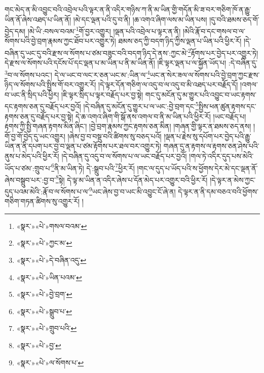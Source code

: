 གང་མེད་ན་མི་འབྱུང་བའི་འབྲེལ་པའི་ལྟར་ན་ནི་འདིར་གཉིས་ཀ་ནི་མ་ཡིན་གྱི་གདོན་མི་ཟ་བར་གཅིག་ཁོ་ན་རྒྱུ་ཡིན་ནོ་ཞེས་འཐད་པ་ཡིན་ནོ། །མེ་དང་ལྡན་པའི་དུ་བ་ནི། །ཆ་འགའ་ཞིག་ལས་མ་ཡིན་པས། །དུ་བའི་ཐམས་ཅད་གོ་བྱེད་དམ། །མེ་ཡི་:བསལ་བའམ་\footnote{«སྣར་»«པེ་»གསལ་བའམ་}གོ་བྱར་འགྱུར། །ལྡན་པའི་འབྲེལ་པ་ལྟར་ན་ནི། །མེའི་རྣོ་བ་དང་གསལ་བ་ལ་སོགས་པའི་བྱེ་བྲག་རྣམས་ཀྱང་ཐོབ་པར་འགྱུར་ཏེ། ཐམས་ཅད་ཀྱི་བདག་ཉིད་ཀྱིས་ལྡན་པ་ཡིན་པའི་ཕྱིར་རོ། །དེ་བཞིན་དུ་ཡང་དུ་བའི་རྫས་ལ་སོགས་པ་ཙམ་བཟུང་བའི་བདག་ཉིད་དེ་ནས་:ཀྱང་མེ་\footnote{«སྣར་»«པེ་»ཀྱང་མ་}རྟོགས་པར་བྱེད་པར་འགྱུར་ཏེ། དེ་རྫས་ལ་སོགས་པའི་དངོས་པོ་དང་ལྡན་པ་མ་ཡིན་པ་ནི་མ་ཡིན་ནོ། །ཇི་ལྟར་ལྡན་པ་ལ་སྐྱོན་ཡོད་པ། :དེ་བཞིན་དུ་\footnote{«སྣར་»«པེ་»དེ་བཞིན་འདུ་}བ་ལ་སོགས་པའང་། དེ་ལ་ཡང་བ་ལང་ར་ཅན་ཡང་མ་:ཡིན་ལ་\footnote{«སྣར་»«པེ་»ཡིན་པའམ་}ཡང་ན་སེར་ཟལ་ལ་སོགས་པའི་བྱེ་བྲག་ཀྱང་རྫས་ཉིད་ལ་སོགས་པའི་སྤྱིས་གོ་བར་འགྱུར་རོ། །དེ་ལྟར་དོན་གཅིག་ལ་འདུ་བ་ལ་འདུ་བ་མི་འཐད་པར་བརྗོད་དོ། །འགལ་བ་ཡང་ནི་སྲིད་པའི་ཕྱིར། །ཇི་ལྟར་སྲིད་པ་ལྟར་བརྗོད་པར་བྱ་སྟེ། གང་དུ་མངོན་དུ་མ་གྱུར་པའི་འབྱུང་བ་ཡང་རྟགས་དང་རྟགས་ཅན་དུ་བརྗོད་པར་བྱའོ། །དེ་བཞིན་དུ་མངོན་དུ་གྱུར་པ་ལ་ཡང་:བྱེ་བྲག་དང་\footnote{«སྣར་»«པེ་»བྱེ་བྲག་}སྤྱིས་ཕན་ཚུན་རྟགས་དང་རྟགས་ཅན་དུ་བརྗོད་པར་བྱ་སྟེ། དེ་ཆ་འགའ་ཞིག་གི་སྒོ་ནས་འགལ་བ་ནི་མ་ཡིན་པའི་ཕྱིར་རོ། །ཡང་བརྗོད་པ། རྟགས་ཀྱི་སྤྱི་གཞན་རྟགས་མིན་ཞིང་། །བྱེ་བྲག་རྣམས་ཀྱང་རྟགས་ཅན་མིན། །གཞན་གྱི་ལྟར་ན་ཐམས་ཅད་ནས། །གོ་བྱ་གོ་བྱེད་དུ་ཡང་འགྱུར། །ཞེས་བྱ་བ་བསྡུ་བའི་ཚིགས་སུ་བཅད་པའོ། །ལྡན་པ་རྗེས་སུ་དཔོག་པར་བྱེད་པའི་རྒྱུ་ཡིན་ན་ནི་དཔག་པར་བྱ་བ་ལྡན་པ་ཙམ་རྟོགས་པར་ཐལ་བར་འགྱུར་ཏེ། གཞན་དུ་ན་རྟགས་ལ་རྟགས་ཅན་ཤེས་པའི་ནུས་པ་མེད་པའི་ཕྱིར་རོ། །དེ་བཞིན་དུ་འདུ་བ་ལ་སོགས་པ་ལ་ཡང་བརྗོད་པར་བྱའོ། །གལ་ཏེ་འདིར་དུད་པས་མེའི་ཡོད་པ་ཙམ་:གྲུབ་པ་\footnote{«སྣར་»«པེ་»སྒྲུབ་པ་}ནི་མ་ཡིན་ཏེ། དེ་:སྒྲུབ་པའི་\footnote{«སྣར་»«པེ་»གྲུབ་པའི་}ཕྱིར་རོ། །གང་ལ་དུད་པ་ཡོད་པའི་ས་ཕྱོགས་དེར་མེ་དང་ལྡན་ནོ་ཞེས་བསྒྲུབ་པར་:བྱ་བ་\footnote{«སྣར་»«པེ་»བྱ་}སྟེ། དེ་ལྟ་མ་ཡིན་ན་འདིར་ཞེས་པ་དོན་མེད་པར་འགྱུར་བའི་ཕྱིར་རོ། །དེ་ལྟར་ན་མེས་ཀྱང་དུད་པའམ་མེའི་:རྣོ་བ་ལ་སོགས་པ་ལ་\footnote{«སྣར་»«པེ་»ལ་སོགས་པ་}ཡང་ཞེས་བྱ་བ་ཡང་མི་འབྱུང་ངོ་ཞེ་ན། དེ་ལྟར་ན་ནི་དམ་བཅའ་བའི་ཕྱོགས་གཅིག་གཏན་ཚིགས་སུ་འགྱུར་རོ། །
